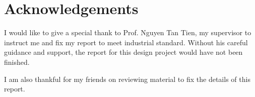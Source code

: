 \chapter*{Acknowledgements}
	
	I would like to give a special thank to Prof. Nguyen Tan Tien, my supervisor to instruct me and fix my report to meet industrial standard. Without his careful guidance and support, the report for this design project would have not been finished.
	
	I am also thankful for my friends on reviewing material to fix the details of this report.